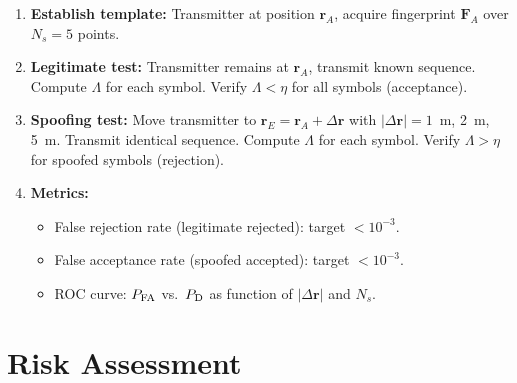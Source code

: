 \documentclass[11pt,onecolumn]{article}
\begin{document}
\begin{enumerate}
\item \textbf{Establish template:} Transmitter at position $\mathbf{r}_A$,
acquire fingerprint $\mathbf{F}_A$ over $N_s = 5$ points.

\item \textbf{Legitimate test:} Transmitter remains at $\mathbf{r}_A$,
transmit known sequence.
Compute $\Lambda$ for each symbol.
Verify $\Lambda < \eta$ for all symbols (acceptance).

\item \textbf{Spoofing test:} Move transmitter to
$\mathbf{r}_E = \mathbf{r}_A + \Delta\mathbf{r}$ with
$|\Delta\mathbf{r}| = 1$~m, 2~m, 5~m.
Transmit identical sequence.
Compute $\Lambda$ for each symbol.
Verify $\Lambda > \eta$ for spoofed symbols (rejection).

\item \textbf{Metrics:}
\begin{itemize}
\item False rejection rate (legitimate rejected): target $< 10^{-3}$.
\item False acceptance rate (spoofed accepted): target $< 10^{-3}$.
\item ROC curve: $P_{\rm FA}$ vs.\ $P_{\rm D}$ as function of
$|\Delta\mathbf{r}|$ and $N_s$.
\end{itemize}
\end{enumerate}

\section{Risk Assessment}
\end{document}
